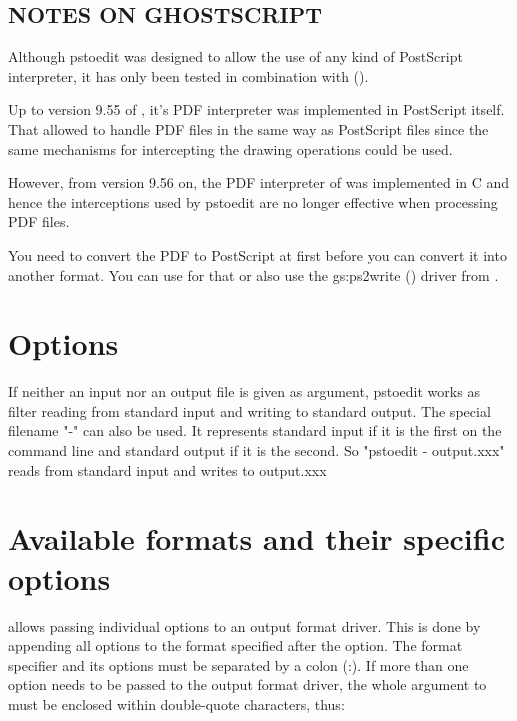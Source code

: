 \documentclass[english,a4paper]{article}
\begin{document}
\subsection{NOTES ON GHOSTSCRIPT}

Although pstoedit was designed to allow the use of any kind of PostScript interpreter, it 
has only been tested in combination with  
().

Up to version 9.55 of , it's PDF interpreter was implemented in PostScript itself.
That allowed  to handle PDF files in the same way as PostScript files since the same 
mechanisms for intercepting the drawing operations could be used.

However, from version 9.56 on, the PDF interpreter of  was implemented in C and 
hence the interceptions used by pstoedit are no longer effective when processing PDF files.

You need to convert the PDF to PostScript at first before you can convert it into another format.
You can use  for that or also use the gs:ps2write () driver from .

\section{Options}




If neither an input nor an output file is given as argument, pstoedit works as filter reading from standard input and
writing to standard output.
The special filename "-" can also be used. It represents standard input if it is the first on the command line and standard output if it is the second. So "pstoedit - output.xxx" reads from standard input and writes to output.xxx


\section{Available formats and their specific options}

 allows passing individual options to an output format driver. This is done by
appending all options to the format specified after the  option. The format
specifier and its options must be separated by a colon (:). If more than one
option needs to be passed to the output format driver, the whole argument to  must be
enclosed within double-quote characters, thus:
\end{document}
